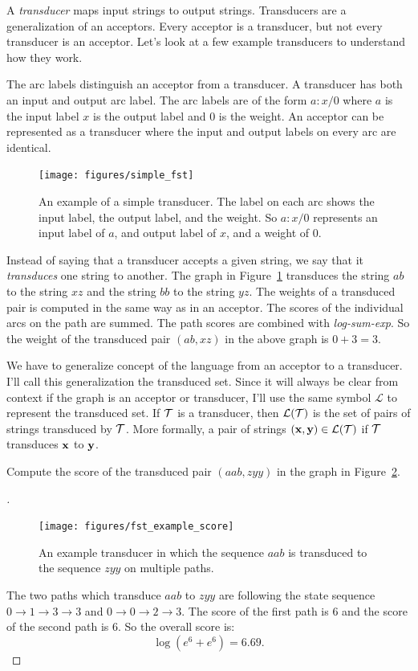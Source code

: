 A \emph{transducer} maps input strings to output strings. Transducers are a
generalization of an acceptors. Every acceptor is a transducer, but not every
transducer is an acceptor. Let's look at a few example transducers to
understand how they work.

The arc labels distinguish an acceptor from a transducer. A transducer has both
an input and output arc label. The arc labels are of the form $a\!:\!x/0$ where
$a$ is the input label $x$ is the output label and $0$ is the weight. An
acceptor can be represented as a transducer where the input and output labels
on every arc are identical.

\begin{figure}
    \centering
    \texttt{[image: figures/simple\_fst]}
    \caption{An example of a simple transducer. The label on each arc shows the
    input label, the output label, and the weight. So $a\!:\!x/0$ represents an
    input label of $a$, and output label of $x$, and a weight of $0$.}
    \label{fig:simple_fst}
\end{figure}

Instead of saying that a transducer accepts a given string, we say that it
\emph{transduces} one string to another. The graph in
Figure~\ref{fig:simple_fst} transduces the string $ab$ to the string $xz$ and
the string $bb$ to the string $yz$. The weights of a transduced pair is
computed in the same way as in an acceptor. The scores of the individual arcs
on the path are summed. The path scores are combined with \emph{log-sum-exp}.
So the weight of the transduced pair $(ab, xz)$ in the above graph is $0+3 =
3$.

We have to generalize concept of the language from an acceptor to a transducer.
I'll call this generalization the transduced set. Since it will always be clear
from context if the graph is an acceptor or transducer, I'll use the same
symbol $\mathcal{L}$ to represent the transduced set. If $\mathcal{T}$ is a transducer,
then $\mathcal{L}(\mathcal{T})$ is the set of pairs of strings transduced by $\mathcal{T}$.
More formally, a pair of strings $({\bf x}, {\bf y}) \in \mathcal{L}(\mathcal{T})$ if $\mathcal{T}$
transduces ${\bf x}$ to ${\bf y}$.

\begin{example}
Compute the score of the transduced pair $(aab, zyy)$ in the graph in
Figure~\ref{fig:fst_example_score}.
\end{example}

\begin{proof}[\unskip\nopunct]
\begin{figure}
    \centering
    \texttt{[image: figures/fst\_example\_score]}
    \caption{An example transducer in which the sequence $aab$ is transduced to
    the sequence $zyy$ on multiple paths.}
    \label{fig:fst_example_score}
\end{figure}

The two paths which transduce $aab$ to $zyy$ are following the state sequence
$0 \rightarrow 1 \rightarrow 3 \rightarrow 3$ and $0 \rightarrow 0 \rightarrow
2 \rightarrow 3$. The score of the first path is $6$ and the score of the
second path is $6$. So the overall score is:
$$
\log \left(e^6 + e^6\right) = 6.69.
$$
\end{proof}

